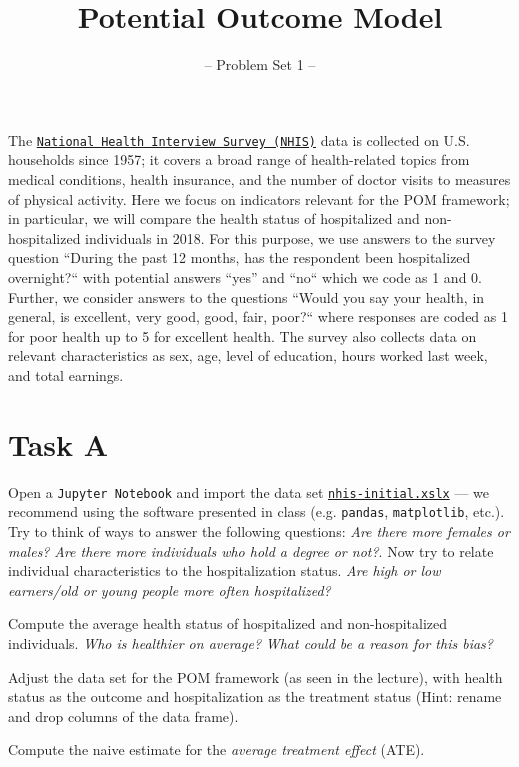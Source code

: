 

\title{Potential Outcome Model}
\subtitle{-- Problem Set 1 --}
\date{}

\maketitle\vspace{-2cm}

The \href{https://www.cdc.gov/nchs/nhis/index.htm}{\texttt{National Health Interview Survey (NHIS)}} data is collected on U.S. households since 1957; it covers a broad range of health-related topics from medical conditions, health insurance, and the number of doctor visits to measures of physical activity. Here we focus on indicators relevant for the POM framework; in particular, we will compare the health status of hospitalized and non-hospitalized individuals in 2018.
For this purpose, we use answers to the survey question ``During the past 12 months, has the respondent been hospitalized overnight?`` with potential answers ``yes'' and ``no`` which we code as 1 and 0. Further, we consider answers to the questions ``Would you say your health, in general, is excellent, very good, good, fair, poor?`` where responses are coded as 1 for poor health up to 5 for excellent health. The survey also collects data on relevant characteristics as sex, age, level of education, hours worked last week, and total earnings.

\section*{Task A} 

\begin{boenumerate}

  \item Open a \texttt{Jupyter Notebook} and import the data set \href{https://github.com/HumanCapitalAnalysis/microeconometrics/tree/peisenha_integration_problem_set/problem-sets/01-potential-outcome-model/data}{\texttt{nhis-initial.xslx}} --- we recommend using the software presented in class (e.g. \texttt{pandas}, \texttt{matplotlib}, etc.). Try to think of ways to answer the following questions: \emph{Are there more females or males?} \emph{Are there more individuals who hold a degree or not?}. Now try to relate individual characteristics to the hospitalization status. \emph{Are high or low earners/old or young people more often hospitalized?}

  \item Compute the average health status of hospitalized and non-hospitalized individuals. \emph{Who is healthier on average?} \emph{What could be a reason for this bias?}

  \item Adjust the data set for the POM framework (as seen in the lecture), with health status as the outcome and hospitalization as the treatment status (Hint: rename and drop columns of the data frame).

  \item Compute the naive estimate for the \emph{average treatment effect} (ATE).

\end{boenumerate}


